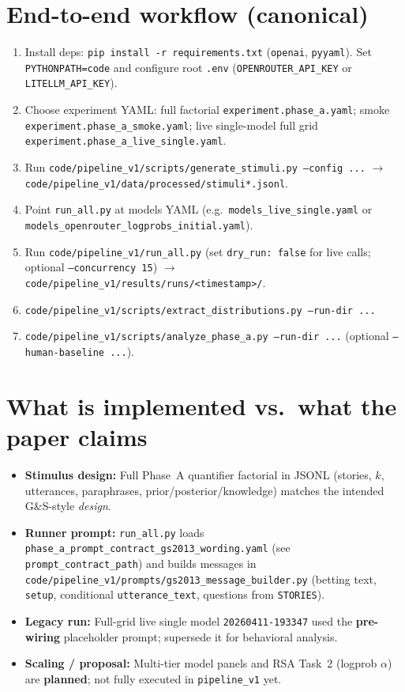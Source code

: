 \documentclass[11pt]{article}
\begin{document}
\section{End-to-end workflow (canonical)}
\begin{enumerate}
  \item Install deps: \texttt{pip install -r requirements.txt} (\texttt{openai}, \texttt{pyyaml}). Set \texttt{PYTHONPATH=code} and configure root \texttt{.env} (\texttt{OPENROUTER\_API\_KEY} or \texttt{LITELLM\_API\_KEY}).
  \item Choose experiment YAML: full factorial \texttt{experiment.phase\_a.yaml}; smoke \texttt{experiment.phase\_a\_smoke.yaml}; live single-model full grid \texttt{experiment.phase\_a\_live\_single.yaml}.
  \item Run \texttt{code/pipeline\_v1/scripts/generate\_stimuli.py --config ...} $\rightarrow$ \texttt{code/pipeline\_v1/data/processed/stimuli*.jsonl}.
  \item Point \texttt{run\_all.py} at models YAML (e.g.\ \texttt{models\_live\_single.yaml} or \texttt{models\_openrouter\_logprobs\_initial.yaml}).
  \item Run \texttt{code/pipeline\_v1/run\_all.py} (set \texttt{dry\_run: false} for live calls; optional \texttt{--concurrency 15}) $\rightarrow$ \texttt{code/pipeline\_v1/results/runs/<timestamp>/}.
  \item \texttt{code/pipeline\_v1/scripts/extract\_distributions.py --run-dir ...}
  \item \texttt{code/pipeline\_v1/scripts/analyze\_phase\_a.py --run-dir ...} (optional \texttt{--human-baseline ...}).
\end{enumerate}

\section{What is implemented vs.\ what the paper claims}
\begin{itemize}
  \item \textbf{Stimulus design:} Full Phase~A quantifier factorial in JSONL (stories, $k$, utterances, paraphrases, prior/posterior/knowledge) matches the intended G\&S-style \emph{design}.
  \item \textbf{Runner prompt:} \texttt{run\_all.py} loads \texttt{phase\_a\_prompt\_contract\_gs2013\_wording.yaml} (see \texttt{prompt\_contract\_path}) and builds messages in \texttt{code/pipeline\_v1/prompts/gs2013\_message\_builder.py} (betting text, \texttt{setup}, conditional \texttt{utterance\_text}, questions from \texttt{STORIES}).
  \item \textbf{Legacy run:} Full-grid live single model \texttt{20260411-193347} used the \textbf{pre-wiring} placeholder prompt; supersede it for behavioral analysis.
  \item \textbf{Scaling / proposal:} Multi-tier model panels and RSA Task~2 (logprob $\alpha$) are \textbf{planned}; not fully executed in \texttt{pipeline\_v1} yet.
\end{itemize}
\end{document}
